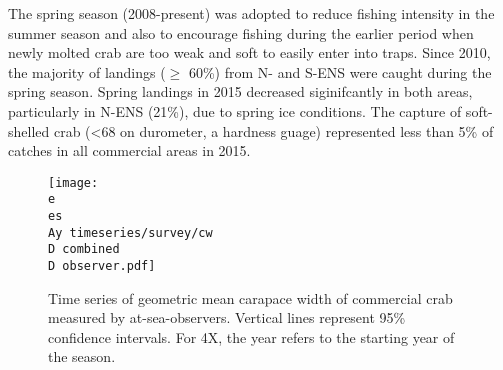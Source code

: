 \documentclass[paper=a4, fontsize=11pt]{article}
\newcommand{\D}{.}
\newcommand{\e}{/home/michelle/ecomod_data/}
\newcommand{\es}{snowcrab/}
\newcommand{\Ay}{assessments/2015/}
\begin{document}
The spring season (2008-present) was adopted to reduce fishing intensity in the summer season and also to encourage fishing during the earlier period when newly molted crab are too weak and soft to easily enter into traps. Since 2010, the majority of landings ($\geq$ 60\%) from N- and S-ENS were caught during the spring season. Spring landings in 2015 decreased siginifcantly in both areas, particularly in N-ENS (21\%), due to spring ice conditions. The capture of soft-shelled crab (<68 on durometer, a hardness guage) represented less than 5\% of catches in all commercial areas in 2015.\\

\begin{figure}[h]
    \centering
    \texttt{[image: \\e \\es \\Ay timeseries/survey/cw\\D combined\\D observer.pdf]}
    \caption{Time series of geometric mean carapace width of commercial crab measured by at-sea-observers. Vertical lines represent 95\% confidence intervals. For 4X, the year refers to the starting year of the season.}
\end{figure}
\end{document}
